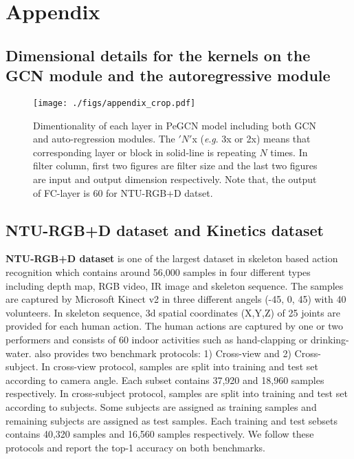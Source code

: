 \documentclass[runningheads]{llncs}
\newcommand{\eg}{\textit{e}.\textit{g}. }
\begin{document}
\small



\clearpage
\setcounter{page}{1}
\setcounter{section}{1}
\setcounter{table}{0}
\setcounter{figure}{0}
 \renewcommand{\thesection}{A}
\section*{\centering{}Appendix}

\subsection{Dimensional details for the kernels on the GCN module and the autoregressive module}
\label{apx:1}

\begin{figure*}
	\vspace{-1cm}
	\begin{center}
		\centerline{\texttt{[image: ./figs/appendix\_crop.pdf]}}
		\caption{Dimentionality of each layer in PeGCN model including both GCN and auto-regression modules. 
		The $'N'$x (\eg 3x or 2x) means that corresponding layer or block in solid-line  is repeating $N$ times.
		In filter column, first two figures are filter size and the last two figures are input and output dimension respectively.
		Note that, the output of FC-layer is 60 for NTU-RGB+D datset.}
	\end{center}
	\vspace{-8ex}
\end{figure*}



\newpage
\subsection{NTU-RGB+D dataset and Kinetics dataset}
\label{apx:2}
\textbf{NTU-RGB+D dataset} \cite{shahroudy2016ntu} is one of the largest dataset in skeleton based action recognition which contains around 56,000 samples in four different types including depth map, RGB video, IR image and skeleton sequence.  The samples are captured by Microsoft Kinect v2 in three different angels (-45, 0, 45) with 40 volunteers. In skeleton sequence, 3d spatial coordinates (X,Y,Z) of 25 joints are provided for each human action. The human actions are captured by one or two performers and consists of 60 indoor activities such as hand-clapping or drinking-water. \cite{shahroudy2016ntu} also provides two benchmark protocols: 1) Cross-view and 2) Cross-subject.  In cross-view protocol, samples are split into training and test set according to camera angle. Each subset contains 37,920 and 18,960 samples respectively. In cross-subject protocol, samples are split into training and test set according to subjects. Some subjects are assigned as training samples and remaining subjects are assigned as test samples. Each training and test sebsets contains 40,320 samples and 16,560 samples respectively. We follow these protocols and report the top-1 accuracy on both benchmarks.
\end{document}
